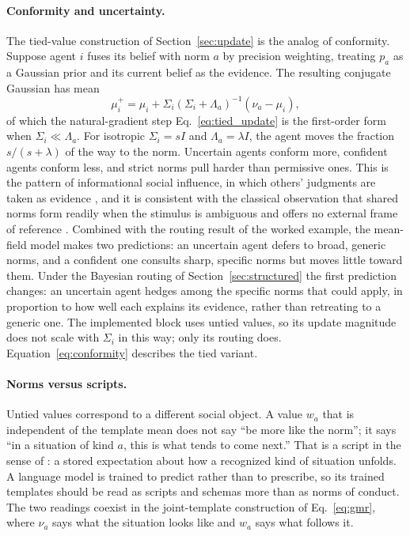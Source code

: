 \documentclass[11pt]{article}
\theoremstyle{definition}
\theoremstyle{remark}
\begin{document}
\paragraph{Conformity and uncertainty.}
The tied-value construction of Section~\ref{sec:update} is the analog of conformity. Suppose agent $i$ fuses its belief with norm $a$ by precision weighting, treating $p_a$ as a Gaussian prior and its current belief as the evidence. The resulting conjugate Gaussian has mean
\begin{equation}
\mu_i^{+}=\mu_i+\Sigma_i(\Sigma_i+\Lambda_a)^{-1}(\nu_a-\mu_i),
\label{eq:conformity}
\end{equation}
of which the natural-gradient step Eq.~\eqref{eq:tied_update} is the first-order form when $\Sigma_i\ll\Lambda_a$. For isotropic $\Sigma_i=sI$ and $\Lambda_a=\lambda I$, the agent moves the fraction $s/(s+\lambda)$ of the way to the norm. Uncertain agents conform more, confident agents conform less, and strict norms pull harder than permissive ones. This is the pattern of informational social influence, in which others' judgments are taken as evidence \citep{deutsch1955}, and it is consistent with the classical observation that shared norms form readily when the stimulus is ambiguous and offers no external frame of reference \citep{sherif1936}. Combined with the routing result of the worked example, the mean-field model makes two predictions: an uncertain agent defers to broad, generic norms, and a confident one consults sharp, specific norms but moves little toward them. Under the Bayesian routing of Section~\ref{sec:structured} the first prediction changes: an uncertain agent hedges among the specific norms that could apply, in proportion to how well each explains its evidence, rather than retreating to a generic one. The implemented block uses untied values, so its update magnitude does not scale with $\Sigma_i$ in this way; only its routing does. Equation~\eqref{eq:conformity} describes the tied variant.

\paragraph{Norms versus scripts.}
Untied values correspond to a different social object. A value $w_a$ that is independent of the template mean does not say ``be more like the norm''; it says ``in a situation of kind $a$, this is what tends to come next.'' That is a script in the sense of \citet{schank1977}: a stored expectation about how a recognized kind of situation unfolds. A language model is trained to predict rather than to prescribe, so its trained templates should be read as scripts and schemas more than as norms of conduct. The two readings coexist in the joint-template construction of Eq.~\eqref{eq:gmr}, where $\nu_a$ says what the situation looks like and $w_a$ says what follows it.
\end{document}
